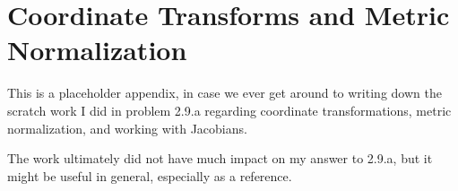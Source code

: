 \chapter{Coordinate Transforms and Metric Normalization}
\label{appendix_coord_trans}

This is a placeholder appendix, in case we ever get around to writing down the scratch work I did in problem 2.9.a regarding coordinate transformations, metric normalization, and working with Jacobians. 

The work ultimately did not have much impact on my answer to 2.9.a, but it might be useful in general, especially as a reference.

